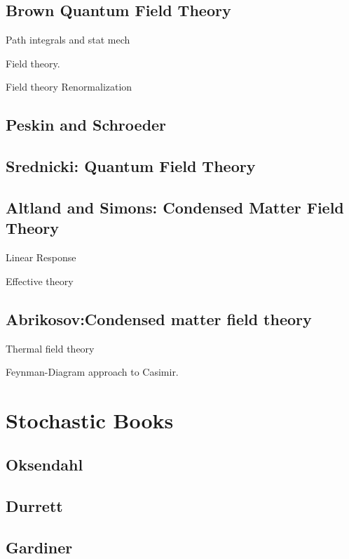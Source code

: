 \subsection{Brown Quantum Field Theory}

\cite{Brown1994}
Path integrals and stat mech

Field theory.  

Field theory Renormalization

\subsection{Peskin and Schroeder}
\cite{Peskin1995}

\subsection{Srednicki: Quantum Field Theory}
\cite{Srednicki2008}

\subsection{Altland and Simons: Condensed Matter Field Theory}
\cite{Altland2011}

Linear Response

Effective theory

\subsection{Abrikosov:Condensed matter field theory}

\cite{Abrikosov1975}
Thermal field theory

Feynman-Diagram approach to Casimir.


\section{Stochastic Books}

\subsection{Oksendahl}

\subsection{Durrett}

\subsection{Gardiner}



